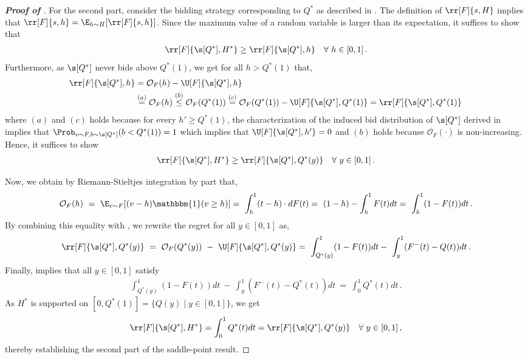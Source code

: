 \begin{proof}[\textbf{Proof of }]
	For the second part, consider the bidding strategy corresponding to $Q^*$ as described in . The definition of $\rr[F]{s,H}$ implies that $\rr[F]{s,h} = \E_{h \sim H}[\rr[F]{s,h}]$. Since the maximum value of a random variable is larger than its expectation, it suffices to show that
	\begin{align*}
		\rr[F]{\s[Q^*], H^*} \geq \rr[F]{\s[Q^*],h} \quad \forall\ h \in [0,1]\,.
	\end{align*}
	Furthermore, as $\s[Q^*]$ never bids above $Q^*(1)$, we get for all $h > Q^*(1)$ that,
	\begin{align*}
		\rr[F]{\s[Q^*], h} &= \mathcal{O}_{F}(h) - \U[F]{\s[Q^*], h}\\
        &\stackrel{(a)}{=} \mathcal{O}_{F}(h)  \stackrel{(b)}{\leq} \mathcal{O}_{F}(Q^*(1)) \stackrel{(c)}{=} \mathcal{O}_{F}(Q^*(1)) - \U[F]{\s[Q^*], Q^*(1)} = \rr[F]{\s[Q^*], Q^*(1)}\,
	\end{align*}
    where $(a)$ and $(c)$ holds because for every $h' \geq Q^*(1)$, the characterization of the induced bid distribution of $\s[Q^*]$ derived in  implies that $\Prob_{v \sim F, b \sim \s[Q^*]}(b < Q^*(1)) = 1$ which implies that  $\U[F]{\s[Q^*], h'} = 0 $ and $(b)$ holds because $\mathcal{O}_{F}(\cdot)$ is non-increasing. 
    Hence, it suffices to show
	\begin{align*}
		\rr[F]{\s[Q^*], H^*} \geq \rr[F]{\s[Q^*],Q^*(y)} \quad \forall\ y \in [0,1]\,.
	\end{align*}
	
	Now, we obtain by Riemann-Stieltjes integration by part that,
	\begin{align*}
		\mathcal O_{F}(h)\ =\ \E_{v \sim F}[(v - h)\mathbbm{1}(v \geq h)] = \ \int_h^1 (t - h) \cdot dF(t) =\ (1 - h) -  \int_h^1 F(t) dt =\ \int_h^1 (1 - F(t)) dt\,.
	\end{align*}
	By combining this equality with , we rewrite the regret for all $y \in [0,1]$ as,
	\begin{align*}
		 \rr[F]{\s[Q^*],Q^*(y)}\ =\ \mathcal{O}_{F}(Q^*(y))\ -\ \U[F]{\s[Q^*], Q^*(y)} =\  \int_{Q^*(y)}^1 (1 - F(t))dt -\ \int_y^1 (F^-(t) - Q(t))dt\,.
	\end{align*}
	Finally,  implies that all $y \in [0,1]$ satisfy
	\begin{align*}
		\int_{Q^*(y)}^1 (1 - F(t)) dt\ -\ \int_y^1 (F^-(t) - Q^*(t)) dt\ =\ \int_0^1 Q^*(t) dt\,.
	\end{align*}
	As $H^*$ is supported on $[0, Q^*(1)] = \{Q(y) \mid y \in [0,1]\}$, we get
	\begin{align*}
		\rr[F]{\s[Q^*], H^*} = \int_0^1 Q^*(t) dt = \rr[F]{\s[Q^*],Q^*(y)} \quad \forall\ y \in [0,1]\,,
	\end{align*}
	thereby establishing the second part of the saddle-point result.
\end{proof}

